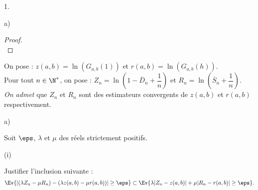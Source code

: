 \documentclass[11pt]{article}%
\begin{document}
\begin{noliste}{1.}
\begin{noliste}{a)}
\begin{proof}
    ~\\[-1.4cm]
    \end{proof}
  \end{noliste}
  

  
  
  
  


\item On pose : $z(a,b)=\ln(G_{a,b}(1))$ et $r(a,b)=\ln(G_{a,b}(h))$.\\
  Pour tout $n\in\N^*$, on pose : $Z_n = \ln\left(1-\overline{D}_n
    +\dfrac{1}{n}\right)$ et $R_n =
  \ln\left(\overline{S}_n+\dfrac{1}{n}\right)$.\\
  {\it On admet} que $Z_n$ et $R_n$ sont des estimateurs convergents
  de $z(a,b)$ et $r(a,b)$ respectivement.
  \begin{noliste}{a)}
    \setlength{\itemsep}{2mm}
  \item Soit $\eps$, $\lambda$ et $\mu$ des réels strictement
    positifs.
    \begin{noliste}{(i)}
    \item Justifier l'inclusion suivante :
      \[
      \Ev{ \left\vert (\lambda Z_n-\mu R_n) - (\lambda z(a,b) -\mu
          r(a,b))\right\vert \geq \eps} \subset \Ev{\lambda
        \vert Z_n - z(a,b)\vert + \mu \vert R_n-r(a,b)\vert \geq
        \eps}.
      \]
      

\end{noliste}
\end{noliste}
\end{noliste}
\end{document}
